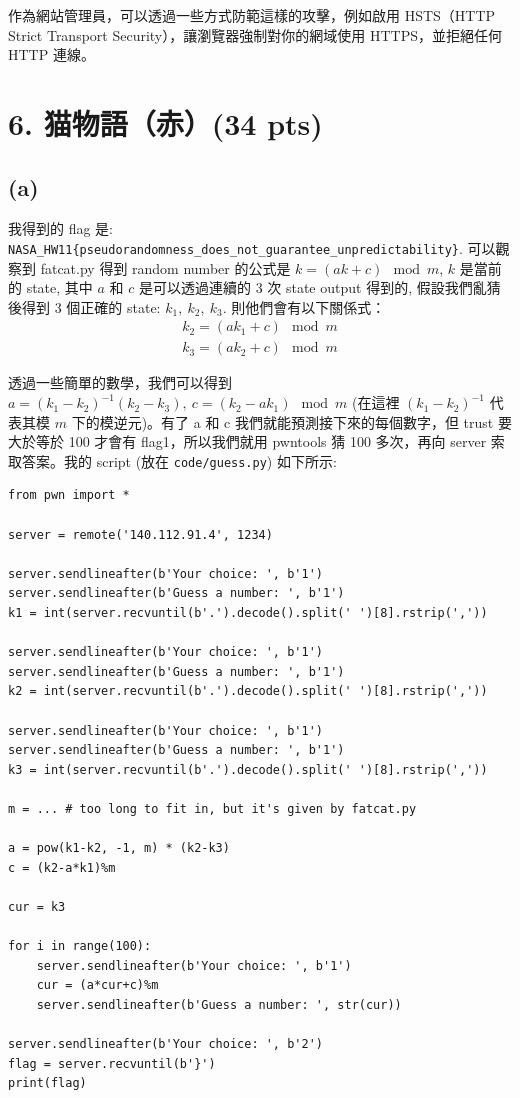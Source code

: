 \documentclass[12pt]{article}
\begin{document}
作為網站管理員，可以透過一些方式防範這樣的攻擊，例如啟用 HSTS（HTTP Strict Transport Security），讓瀏覽器強制對你的網域使用 HTTPS，並拒絕任何 HTTP 連線。

\newpage
\section*{6. 猫物語（赤）(34 pts)}
\subsection*{(a)}
我得到的 flag 是: \verb|NASA_HW11{pseudorandomness_does_not_guarantee_unpredictability}|. 可以觀察到 fatcat.py 得到 random number 的公式是 $k=(ak+c)\mod{m}$, $k$ 是當前的 state, 其中 $a$ 和 $c$ 是可以透過連續的 3 次 state output 得到的, 假設我們亂猜後得到 3 個正確的 state: $k_1,\ k_2,\ k_3$. 則他們會有以下關係式：
\begin{align*}
    k_2=(ak_1+c)\mod{m} \\
    k_3=(ak_2+c)\mod{m}
\end{align*}

透過一些簡單的數學，我們可以得到 $a=(k_1-k_2)^{-1}(k_2-k_3),\ c=(k_2-ak_1)\mod{m}$ (在這裡 $(k_1-k_2)^{-1}$ 代表其模 $m$ 下的模逆元)。有了 a 和 c 我們就能預測接下來的每個數字，但 trust 要大於等於 100 才會有 flag1，所以我們就用 pwntools 猜 100 多次，再向 server 索取答案。我的 script (放在 \verb|code/guess.py|) 如下所示:
\begin{verbatim}
from pwn import *

server = remote('140.112.91.4', 1234)

server.sendlineafter(b'Your choice: ', b'1')
server.sendlineafter(b'Guess a number: ', b'1')
k1 = int(server.recvuntil(b'.').decode().split(' ')[8].rstrip(','))

server.sendlineafter(b'Your choice: ', b'1')
server.sendlineafter(b'Guess a number: ', b'1')
k2 = int(server.recvuntil(b'.').decode().split(' ')[8].rstrip(','))

server.sendlineafter(b'Your choice: ', b'1')
server.sendlineafter(b'Guess a number: ', b'1')
k3 = int(server.recvuntil(b'.').decode().split(' ')[8].rstrip(','))

m = ... # too long to fit in, but it's given by fatcat.py

a = pow(k1-k2, -1, m) * (k2-k3)
c = (k2-a*k1)%m

cur = k3

for i in range(100):
    server.sendlineafter(b'Your choice: ', b'1')
    cur = (a*cur+c)%m
    server.sendlineafter(b'Guess a number: ', str(cur))

server.sendlineafter(b'Your choice: ', b'2')
flag = server.recvuntil(b'}')
print(flag)
\end{verbatim}
\end{document}
